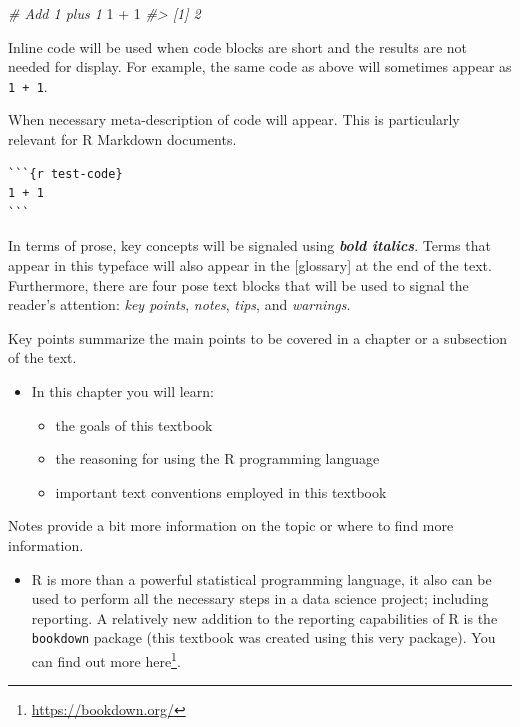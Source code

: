 \documentclass[
]{article}
\newenvironment{Shaded}{\begin{snugshade}}{\end{snugshade}}
\newcommand{\CommentTok}[1]{\textcolor[rgb]{0.56,0.35,0.01}{\textit{#1}}}
\newcommand{\DecValTok}[1]{\textcolor[rgb]{0.00,0.00,0.81}{#1}}
\newcommand{\SpecialCharTok}[1]{\textcolor[rgb]{0.00,0.00,0.00}{#1}}
\DeclareRobustCommand{\href}[2]{#2\footnote{\url{#1}}}
\providecommand{\tightlist}{%
  \setlength{\itemsep}{0pt}\setlength{\parskip}{0pt}}
\newenvironment{rmdblock}[1]
  {\begin{shaded*}
  \begin{itemize}
  \renewcommand{\labelitemi}{
    \raisebox{-.5\height}[0pt][0pt]{
      {\setkeys{Gin}{width=2em,keepaspectratio}\texttt{[image: assets/images/\#1]}}
    }
  }
  \item
  }
  {
  \end{itemize}
  \end{shaded*}
  }
\newenvironment{rmdkey}
  {\begin{rmdblock}{key}}
  {\end{rmdblock}}
\newenvironment{rmdnote}
  {\begin{rmdblock}{note}}
  {\end{rmdblock}}
\begin{document}
\begin{Shaded}
\begin{Highlighting}[]
\CommentTok{\# Add 1 plus 1}
\DecValTok{1} \SpecialCharTok{+} \DecValTok{1}
\CommentTok{\#\textgreater{} [1] 2}
\end{Highlighting}
\end{Shaded}

Inline code will be used when code blocks are short and the results are not needed for display. For example, the same code as above will sometimes appear as \texttt{1\ +\ 1}.

When necessary meta-description of code will appear. This is particularly relevant for R Markdown documents.

\begin{verbatim}
```{r test-code}
1 + 1
```
\end{verbatim}

In terms of prose, key concepts will be signaled using \textbf{\emph{bold italics}}. Terms that appear in this typeface will also appear in the {[}glossary{]} at the end of the text. Furthermore, there are four pose text blocks that will be used to signal the reader's attention: \emph{key points}, \emph{notes}, \emph{tips}, and \emph{warnings}.

Key points summarize the main points to be covered in a chapter or a subsection of the text.

\begin{rmdkey}
In this chapter you will learn:

\begin{itemize}
\tightlist
\item
  the goals of this textbook
\item
  the reasoning for using the R programming language
\item
  important text conventions employed in this textbook
\end{itemize}
\end{rmdkey}

Notes provide a bit more information on the topic or where to find more information.

\begin{rmdnote}
R is more than a powerful statistical programming language, it also can
be used to perform all the necessary steps in a data science project;
including reporting. A relatively new addition to the reporting
capabilities of R is the \texttt{bookdown} package (this textbook was
created using this very package). You can find out more
\href{https://bookdown.org/}{here}.
\end{rmdnote}
\end{document}
